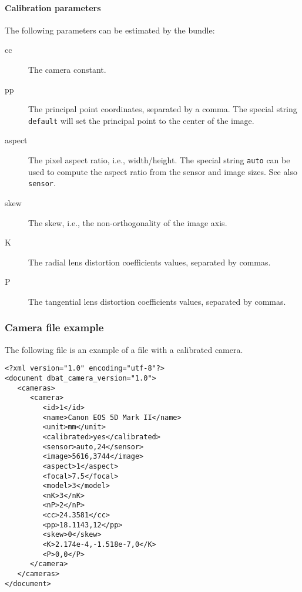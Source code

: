 \documentclass{article}
\begin{document}
\paragraph{Calibration parameters}
\label{sec:org7bbfe63}
The following parameters can be estimated by the bundle:
\begin{description}
\item[{cc}] The camera constant.
\item[{pp}] The principal point coordinates, separated by a comma. The
special string \texttt{default} will set the principal point to the
center of the image.
\item[{aspect}] The pixel aspect ratio, i.e., width/height. The special
string \texttt{auto} can be used to compute the aspect ratio from
the sensor and image sizes. See also \texttt{sensor}.
\item[{skew}] The skew, i.e., the non-orthogonality of the image axis.
\item[{K}] The radial lens distortion coefficients values, separated by
commas.
\item[{P}] The tangential lens distortion coefficients values, separated
by commas.
\end{description}
\subsubsection{Camera file example}
\label{sec:camFileExample}
The following file is an example of a file with a calibrated camera.
\begin{verbatim}
<?xml version="1.0" encoding="utf-8"?>
<document dbat_camera_version="1.0">
   <cameras>
      <camera>
         <id>1</id>
         <name>Canon EOS 5D Mark II</name>
         <unit>mm</unit>
         <calibrated>yes</calibrated>
         <sensor>auto,24</sensor>
         <image>5616,3744</image>
         <aspect>1</aspect>
         <focal>7.5</focal>
         <model>3</model>
         <nK>3</nK>
         <nP>2</nP>
         <cc>24.3581</cc>
         <pp>18.1143,12</pp>
         <skew>0</skew>
         <K>2.174e-4,-1.518e-7,0</K>
         <P>0,0</P>
      </camera>
   </cameras>
</document>
\end{verbatim}
\end{document}

